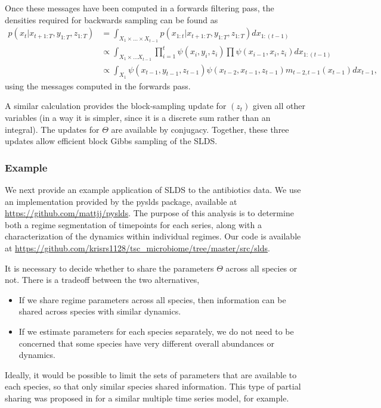 Once these messages have been computed in a forwards filtering pass, the
densities required for backwards sampling can be found as
\begin{align*}
  p\left(x_t \vert x_{t + 1:T}, y_{1:T}, z_{1:T}\right) &=
  \int_{X_1 \times \dots \times X_{t - 1}} p\left(x_{1:t} \vert x_{t + 1: T}, y_{1:T}, z_{1:T}\right) dx_{1:(t - 1)} \\
  &\propto \int_{X_1 \times \dots X_{t - 1}} \prod_{i = 1}^{t} \psi\left(x_i, y_i, z_i\right) \prod \psi\left(x_{i - 1}, x_i, z_i\right) dx_{1:\left(t - 1\right)} \\
  &\propto \int_{X_{1}} \psi\left(x_{t - 1}, y_{t - 1}, z_{t - 1}\right)\psi\left(x_{t - 2}, x_{t - 1}, z_{t - 1}\right) m_{t - 2, t - 1}\left(x_{t - 1}\right) d x_{t - 1},
\end{align*}
using the messages computed in the forwards pass.

A similar calculation provides the block-sampling update for
$\left(z_{t}\right)$ given all other variables (in a way it is simpler, since it
is a discrete sum rather than an integral). The updates for $\Theta$ are
available by conjugacy. Together, these three updates allow efficient block
Gibbs sampling of the SLDS.

\subsubsection{Example}
\label{subsubsec:slds_example}

We next provide an example application of SLDS to the antibiotics data. We use
an implementation provided by the pyslds package, available at
\url{https://github.com/mattjj/pyslds}. The purpose of this analysis is to
determine both a regime segmentation of timepoints for each series, along with a
characterization of the dynamics within individual regimes. Our code is
available at
\url{https://github.com/krisrs1128/tsc_microbiome/tree/master/src/slds}.

It is necessary to decide whether to share the parameters $\Theta$ across all
species or not. There is a tradeoff between the two alternatives,
\begin{itemize}
\item If we share regime parameters across all species, then information can be
  shared across species with similar dynamics.
\item If we estimate parameters for each species separately, we do not need to
  be concerned that some species have very different overall abundances or
  dynamics.
\end{itemize}
Ideally, it would be possible to limit the sets of parameters that are available
to each species, so that only similar species shared information. This type of
partial sharing was proposed in \citep{fox2009sharing} for a similar multiple
time series model, for example.

